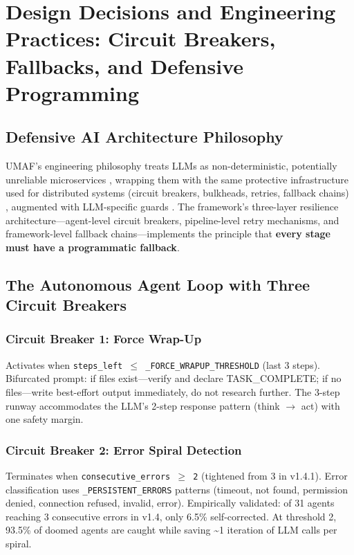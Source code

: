 \section{Design Decisions and Engineering Practices: Circuit Breakers, Fallbacks, and Defensive Programming}
\label{sec:design}

\subsection{Defensive AI Architecture Philosophy}

UMAF's engineering philosophy treats LLMs as non-deterministic, potentially unreliable microservices \cite{evaluatingcompound}, wrapping them with the same protective infrastructure used for distributed systems (circuit breakers, bulkheads, retries, fallback chains) \cite{releaseit}, augmented with LLM-specific guards \cite{vigil,stateharness}. The framework's three-layer resilience architecture---agent-level circuit breakers, pipeline-level retry mechanisms, and framework-level fallback chains---implements the principle that \textbf{every stage must have a programmatic fallback}.

\subsection{The Autonomous Agent Loop with Three Circuit Breakers}

\subsubsection{Circuit Breaker 1: Force Wrap-Up}

Activates when \texttt{steps\_left $\le$ \_FORCE\_WRAPUP\_THRESHOLD} (last 3 steps). Bifurcated prompt: if files exist---verify and declare TASK\_COMPLETE; if no files---write best-effort output immediately, do not research further. The 3-step runway accommodates the LLM's 2-step response pattern (think $\rightarrow$ act) with one safety margin.

\subsubsection{Circuit Breaker 2: Error Spiral Detection}

Terminates when \texttt{consecutive\_errors $\ge$ 2} (tightened from 3 in v1.4.1). Error classification uses \texttt{\_PERSISTENT\_ERRORS} patterns (timeout, not found, permission denied, connection refused, invalid, error). Empirically validated: of 31 agents reaching 3 consecutive errors in v1.4, only 6.5\% self-corrected. At threshold 2, 93.5\% of doomed agents are caught while saving \textasciitilde1 iteration of LLM calls per spiral.

